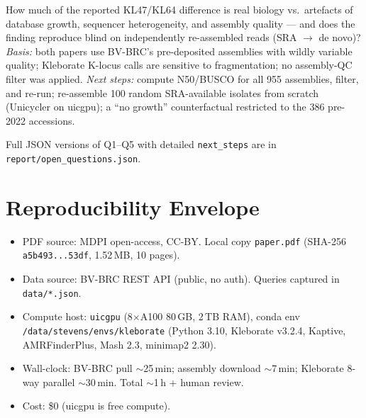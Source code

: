 \documentclass[11pt]{article}
\begin{document}
\begin{description}[leftmargin=*, style=nextline]
\item[Q5. Assembly-quality \& reassembly audit.] How much of the reported KL47/KL64
difference is real biology vs.\ artefacts of database growth, sequencer heterogeneity,
and assembly quality --- and does the finding reproduce blind on independently
re-assembled reads (SRA $\rightarrow$ de novo)?
\emph{Basis:} both papers use BV-BRC's pre-deposited assemblies with wildly variable
quality; Kleborate K-locus calls are sensitive to fragmentation; no assembly-QC filter
was applied.
\emph{Next steps:} compute N50/BUSCO for all 955 assemblies, filter, and re-run;
re-assemble 100 random SRA-available isolates from scratch (Unicycler on uicgpu); a
``no growth'' counterfactual restricted to the 386 pre-2022 accessions.
\end{description}

Full JSON versions of Q1--Q5 with detailed \texttt{next\_steps} are in
\texttt{report/open\_questions.json}.

\section{Reproducibility Envelope}
\begin{itemize}[leftmargin=*, itemsep=1pt]
  \item PDF source: MDPI open-access, CC-BY. Local copy \texttt{paper.pdf}
    (SHA-256 \texttt{a5b493...53df}, 1.52\,MB, 10 pages).
  \item Data source: BV-BRC REST API (public, no auth). Queries captured in \texttt{data/*.json}.
  \item Compute host: \texttt{uicgpu} (8$\times$A100 80\,GB, 2\,TB RAM), conda env
    \texttt{/data/stevens/envs/kleborate} (Python 3.10, Kleborate v3.2.4, Kaptive,
    AMRFinderPlus, Mash 2.3, minimap2 2.30).
  \item Wall-clock: BV-BRC pull $\sim$25\,min; assembly download $\sim$7\,min;
    Kleborate 8-way parallel $\sim$30\,min. Total $\sim$1\,h + human review.
  \item Cost: \$0 (uicgpu is free compute).
\end{itemize}
\end{document}
